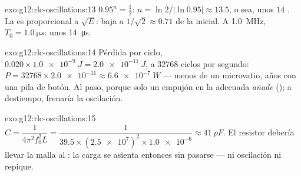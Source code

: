 \begin{solution}{exo:g12:rlc-oscillations:13}
$0.95^n = \tfrac12$: $n = \ln 2/\lvert\ln 0.95\rvert \approx 13.5$, o
sea, unos $14$ . La  es proporcional a $\sqrt{E}$: baja
a $1/\sqrt{2} \approx 0.71$ de la inicial. A \qty{1.0}{MHz},
$T_0 = \qty{1.0}{\micro s}$: unos \qty{14}{\micro s}.
\end{solution}

\begin{solution}{exo:g12:rlc-oscillations:14}
Pérdida por ciclo, $0.020 \times \qty{1.0e-9}{J} = \qty{2.0e-11}{J}$, a
\num{32768} ciclos por segundo: $P = \num{32768} \times \num{2.0e-11}
\approx \qty{6.6e-7}{W}$ --- menos de un microvatio, años con una pila
de botón. Al paso, porque solo un empujón en la  adecuada
\emph{añade}  (); a destiempo, frenaría la oscilación.
\end{solution}

\begin{solution}{exo:g12:rlc-oscillations:15}
$C = \dfrac{1}{4\pi^2 f_0^2 L} = \dfrac{1}{39.5 \times
(\num{2.5e7})^2 \times \num{1.0e-6}} \approx \qty{41}{pF}$. El resistor
debería llevar la malla al : la carga se asienta
entonces sin pasarse --- ni oscilación ni repique.
\end{solution}

